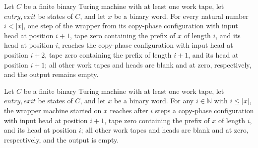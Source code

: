 \begin{lemma}
\label{Complexity.a3_copy_step}
\leanok
{}
Let $C$ be a finite binary Turing machine with at least one work tape, let $entry,exit$
be states of $C$, and let $x$ be a binary word. For every natural number $i<|x|$, one
step of the wrapper from its copy-phase configuration with input head at position $i+1$,
tape zero containing the prefix of $x$ of length $i$, and its head at position $i$,
reaches the copy-phase configuration with input head at position $i+2$, tape zero
containing the prefix of length $i+1$, and its head at position $i+1$; all other work
tapes and heads are blank and at zero, respectively, and the output remains empty.
\end{lemma}

\begin{lemma}
\label{Complexity.a3_copy_run}
\leanok
{}
Let $C$ be a finite binary Turing machine with at least one work tape, let $entry,exit$
be states of $C$, and let $x$ be a binary word. For any $i\in\mathbb{N}$ with $i\le
|x|$, the wrapper machine started on $x$ reaches after $i$ steps a copy-phase
configuration with input head at position $i+1$, tape zero containing the prefix of $x$
of length $i$, and its head at position $i$; all other work tapes and heads are blank
and at zero, respectively, and the output is empty.
\end{lemma}

